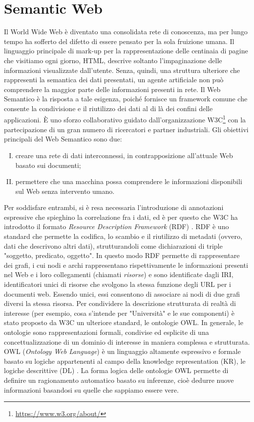 \section{Semantic Web}
Il World Wide Web è diventato una consolidata rete di conoscenza, ma per lungo tempo ha sofferto del difetto di essere pensato per la sola fruizione umana. Il linguaggio principale di mark-up per la rappresentazione delle centinaia di pagine che visitiamo ogni giorno, HTML, descrive soltanto l’impaginazione delle informazioni visualizzate dall'utente. Senza, quindi, una struttura ulteriore che rappresenti la semantica dei dati presentati, un agente artificiale non può comprendere la maggior parte delle informazioni presenti in rete. 
Il Web Semantico è la risposta a tale esigenza, poiché fornisce un framework comune che consente la condivisione e il riutilizzo dei dati al di là dei confini delle applicazioni. È uno sforzo collaborativo guidato dall'organizzazione W3C\footnote{\url{https://www.w3.org/about/}} con la partecipazione di un gran numero di ricercatori e partner industriali. Gli obiettivi principali del Web Semantico \cite{berners2001semantic, hitzler2021review} sono due:
\begin{enumerate}[I)]
	\item creare una rete di dati interconnessi, in contrapposizione all'attuale Web basato sui documenti;
	\item permettere che una macchina possa comprendere le informazioni disponibili sul Web senza intervento umano.
\end{enumerate}
Per soddisfare entrambi, si è resa necessaria l'introduzione di annotazioni espressive che spieghino la correlazione fra i dati, ed è per questo che W3C ha introdotto il formato \textit{Resource Description Framework} (RDF) \cite{RDFspecification}. RDF è uno standard che permette la codifica, lo scambio e il riutilizzo di metadati (ovvero, dati che descrivono altri dati), strutturandoli come dichiarazioni di triple "soggetto, predicato, oggetto". In questo modo RDF permette di rappresentare dei grafi, i cui nodi e archi rappresentano rispettivamente le informazioni presenti nel Web e i loro collegamenti (chiamati \textit{risorse}) e sono identificate dagli IRI, identificatori unici di risorse che svolgono la stessa funzione degli URL per i documenti web. Essendo unici, essi consentono di associare ai nodi di due grafi diversi la stessa risorsa. Per condividere la descrizione strutturata di realtà di interesse (per esempio, cosa s'intende per "Università" e le sue componenti) è stato proposto da W3C un ulteriore standard, le ontologie OWL. In generale, le ontologie sono rappresentazioni formali, condivise ed esplicite di una concettualizzazione di un dominio di interesse \cite{goy2015ontologies} in maniera complessa e strutturata. OWL (\textit{Ontology Web Language}) è un linguaggio altamente espressivo e formale basato su logiche appartenenti al campo della knowledge representation (KR), le logiche descrittive (DL) \cite{baader2017introductionDL}. La forma logica delle ontologie OWL permette di definire un ragionamento automatico basato su inferenze, cioè dedurre nuove informazioni basandosi su quelle che sappiamo essere vere.

